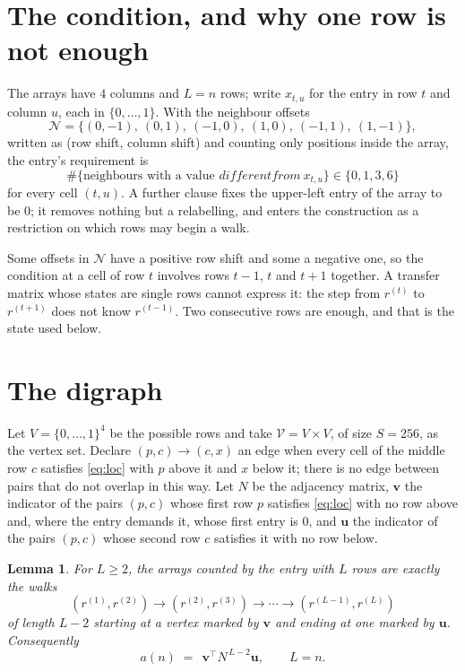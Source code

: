 \documentclass[11pt,a4paper]{article}
\theoremstyle{plain}
\newtheorem{lemma}[theorem]{Lemma}
\theoremstyle{definition}
\begin{document}
\section{The condition, and why one row is not enough}

The arrays have $4$ columns and $L=n$ rows; write $x_{t,u}$ for the entry in
row $t$ and column $u$, each in $\{0,\dots,1\}$. With the neighbour offsets
\[
\mathcal N=\{(0,-1),\ (0,1),\ (-1,0),\ (1,0),\ (-1,1),\ (1,-1)\},
\]
written as (row shift, column shift) and counting only positions inside the array, the
entry's requirement is
\begin{equation}\label{eq:loc}
\#\{\text{neighbours with a value }different from\ x_{t,u}\}\in\{0,1,3,6\}
\end{equation}
for every cell $(t,u)$. A further clause fixes the upper-left entry of the array to be $0$; it removes nothing but a relabelling, and enters the construction as a restriction on which rows may begin a walk.

Some offsets in $\mathcal N$ have a positive row shift and some a negative one, so the
condition at a cell of row $t$ involves rows $t-1$, $t$ and $t+1$ together. A transfer
matrix whose states are single rows cannot express it: the step from $r^{(t)}$ to
$r^{(t+1)}$ does not know $r^{(t-1)}$. Two consecutive rows are enough, and that is
the state used below.

\section{The digraph}

Let $V=\{0,\dots,1\}^{4}$ be the possible rows and take
$\mathcal V=V\times V$, of size $S=256$, as the vertex set. Declare $(p,c)\to(c,x)$ an edge
when every cell of the middle row $c$ satisfies \eqref{eq:loc} with $p$ above it and $x$
below it; there is no edge between pairs that do not overlap in this way. Let $N$ be the
adjacency matrix, $\mathbf{v}$ the indicator of the pairs $(p,c)$ whose first row $p$
satisfies \eqref{eq:loc} with no row above and, where the entry demands it, whose first entry is $0$, and $\mathbf{u}$ the indicator of
the pairs $(p,c)$ whose second row $c$ satisfies it with no row below.

\begin{lemma}\label{lem:walk}
For $L\ge2$, the arrays counted by the entry with $L$ rows are exactly the walks
\[
(r^{(1)},r^{(2)})\to(r^{(2)},r^{(3)})\to\cdots\to(r^{(L-1)},r^{(L)})
\]
of length $L-2$ starting at a vertex marked by $\mathbf{v}$ and ending at one marked by
$\mathbf{u}$. Consequently
\[
a(n)\;=\;\,\mathbf{v}^{\!\top}N^{\,L-2}\mathbf{u},\qquad L=n .
\]
\end{lemma}
\end{document}
